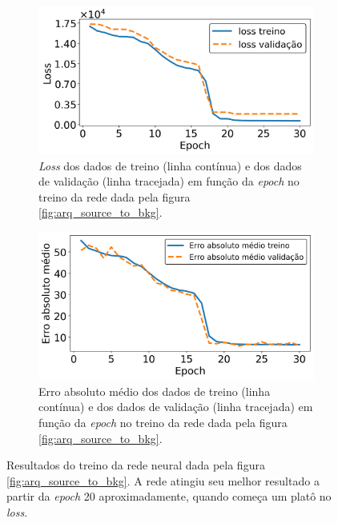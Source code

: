 \documentclass[a4paper,12pt,oneside]{book}
\begin{document}
\begin{figure}[H]
\centering
    \begin{subfigure}[t]{0.49\textwidth}
        \centering
        \includegraphics[scale=0.42]{figs/source_to_bkg_loss.png}
        \caption{\textit{Loss} dos dados de treino (linha contínua) e dos dados de validação (linha tracejada) em função da \textit{epoch} no treino da rede dada pela figura \ref{fig:arq_source_to_bkg}.}
        \label{subfig:source_to_bkg_loss}
    \end{subfigure}%
    \hfill
    \begin{subfigure}[t]{0.45\textwidth}
        \centering
        \includegraphics[scale=0.42]{figs/source_to_bkg_metric.png}
        \caption{Erro absoluto médio dos dados de treino (linha contínua) e dos dados de validação (linha tracejada) em função da \textit{epoch} no treino da rede dada pela figura \ref{fig:arq_source_to_bkg}.}
        \label{subfig:source_to_bkg_metric}
    \end{subfigure}
\caption{Resultados do treino da rede neural dada pela figura \ref{fig:arq_source_to_bkg}. A rede atingiu seu melhor resultado a partir da \textit{epoch} 20 aproximadamente, quando começa um 
platô no \textit{loss}.}
\label{fig:source_to_bkg_results}
\end{figure}
\end{document}
